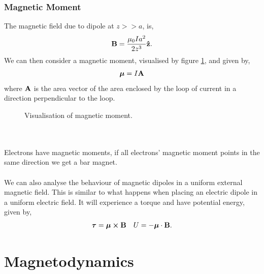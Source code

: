 \documentclass{book}
\begin{document}
\subsection{Magnetic Moment}
The magnetic field due to dipole at $z >> a$, is,
\begin{equation}
    \vb{B} = \frac{\mu_0 I a^2}{2z^3}\vu{z}.
\end{equation}
We can then consider a magnetic moment, visualised by figure \ref{fig:magneticmoment}, and given by,
\begin{equation}
    \vb*{\mu} = I\vb{A}
\end{equation}
where $\vb{A}$ is the area vector of the area enclosed by the loop of current in a direction perpendicular to the loop.
\begin{figure}
    \centering
    \caption{Visualisation of magnetic moment.}
    \label{fig:magneticmoment}
\end{figure}\\\\
Electrons have magnetic moments, if all electrons' magnetic moment points in the same direction we get a bar magnet. \\\\
We can also analyse the behaviour of magnetic dipoles in a uniform external magnetic field. This is similar to what happens when placing an electric dipole in a uniform electric field. It will experience a torque and have potential energy, given by,
\begin{align}
    \vb*{\tau} = \vb*{\mu} \cross \vb{B} && U = -\vb*{\mu} \cdot \vb{B}.
\end{align}

\chapter{Magnetodynamics}
\end{document}
